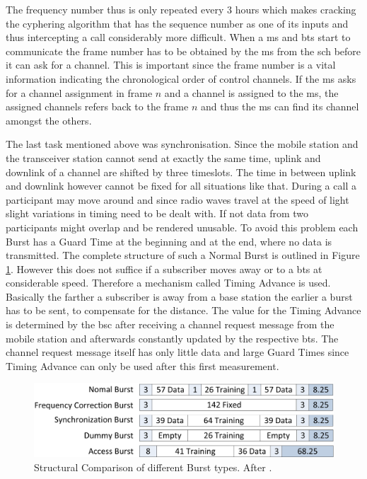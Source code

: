 The frequency number thus is only repeated every 3 hours which makes cracking the cyphering algorithm that has the sequence number as one of its inputs and thus intercepting a call considerably  more difficult.
When a \gls{ms} and \gls{bts} start to communicate the frame number has to be obtained by the \gls{ms} from the \gls{sch} before it can ask for a channel.
This is important since the frame number is a vital information indicating the chronological order of control channels.
If the \gls{ms} asks for a channel assignment in frame $n$ and a channel is assigned to the \gls{ms}, the assigned channels refers back to the frame $n$ and thus the \gls{ms} can find its channel amongst the others.

The last task mentioned above was synchronisation.
Since the mobile station and the transceiver station cannot send at exactly the same time, uplink and downlink of a channel are shifted by three timeslots.
The time in between uplink and downlink however cannot be fixed for all situations like that.
During a call a participant may move around and since radio waves travel at the speed of light slight variations in timing need to be dealt with.
If not data from two participants might overlap and be rendered unusable.
To avoid this problem each Burst has a Guard Time at the beginning and at the end, where no data is transmitted.
The complete structure of such a Normal Burst is outlined in Figure \ref{fig:burst_types}.
However this does not suffice if a subscriber moves away or to a \gls{bts} at considerable speed.
Therefore a mechanism called Timing Advance is used.
Basically the farther a subscriber is away from a base station the earlier a burst has to be sent, to compensate for the distance.
The value for the Timing Advance is determined by the \gls{bsc} after receiving a channel request message from the mobile station and afterwards constantly updated by the respective \gls{bts}.
The channel request message itself has only little data and large Guard Times since Timing Advance can only be used after this first measurement.

\begin{figure}
	\centering
	\includegraphics{../Images/Bursts}
	\caption{Structural Comparison of different Burst types. After \cite{GSM2009}.}
	\label{fig:burst_types}
\end{figure}

